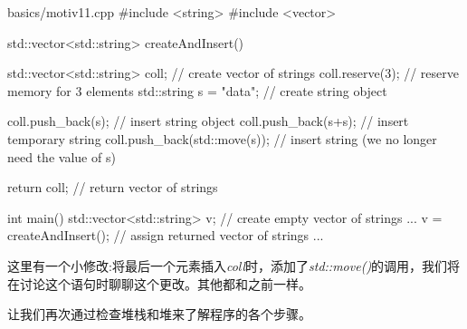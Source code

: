 \begin{codeboxt}[cpp]{basics/motiv11.cpp}
#include <string>
#include <vector>

std::vector<std::string> createAndInsert()
{
  std::vector<std::string> coll; // create vector of strings
  coll.reserve(3); // reserve memory for 3 elements
  std::string s = "data"; // create string object

  coll.push_back(s); // insert string object
  coll.push_back(s+s); // insert temporary string
  coll.push_back(std::move(s)); // insert string (we no longer need the value of s)

  return coll; // return vector of strings
}

int main()
{
  std::vector<std::string> v; // create empty vector of strings
  ...
  v = createAndInsert(); // assign returned vector of strings
  ...
}
\end{codeboxt}

这里有一个小修改:将最后一个元素插入\textit{coll}时，添加了\textit{std::move()}的调用，我们将在讨论这个语句时聊聊这个更改。其他都和之前一样。\par

让我们再次通过检查堆栈和堆来了解程序的各个步骤。\par

